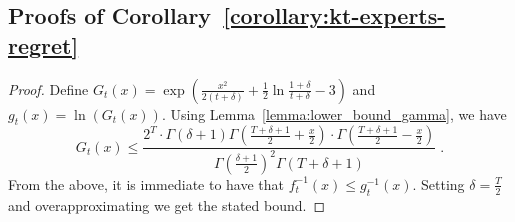 \subsection{Proofs of Corollary~\ref{corollary:kt-experts-regret}}

\begin{proof}
Define $G_t(x)=\exp\left(\frac{x^2}{2(t+\delta)} +\frac{1}{2} \ln \frac{1+\delta}{t+\delta} -3\right)$ and $g_t(x)=\ln(G_t(x))$.
Using Lemma~\ref{lemma:lower_bound_gamma}, we have
\[
G_t(x) \leq \frac{2^T \cdot \Gamma(\delta+1) \Gamma \left(\frac{T+\delta+1}{2} + \frac{x}{2} \right) \cdot \Gamma \left(\frac{T+\delta+1}{2} - \frac{x}{2} \right)}{ \Gamma(\frac{\delta+1}{2})^2 \Gamma(T+\delta+1)} \;.
\]
From the above, it is immediate to have that $f^{-1}_t(x) \leq g^{-1}_t(x)$.
Setting $\delta=\frac{T}{2}$ and overapproximating we get the stated bound.
\end{proof}
